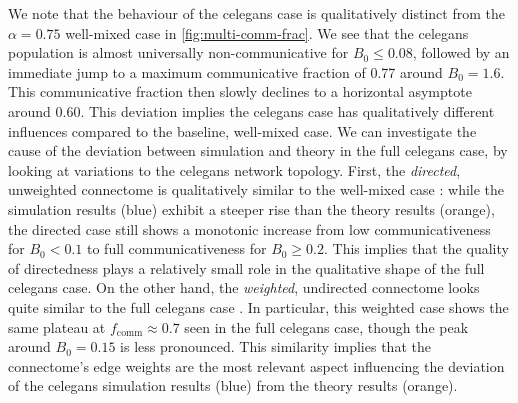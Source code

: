 \documentclass[pdflatex,lineno,referee,sn-nature]{sn-jnl}
\begin{document}
We note that the behaviour
of the  \gls{celegans} case
is qualitatively distinct
from the $\alpha = 0.75$ well-mixed case in \cref{fig:multi-comm-frac}.
We see that the \gls{celegans} population is almost universally non-communicative
for $B_0 \le 0.08$,
followed by an immediate jump to a maximum communicative fraction
of \num{0.77} around $B_0 = 1.6$.
This communicative fraction then slowly declines
to a horizontal asymptote around \num{0.60}.
This deviation implies the \gls{celegans} case
has qualitatively different influences compared to the baseline, well-mixed case.
We can investigate the cause of the deviation
between simulation and theory
in the  full \gls{celegans} case,
by looking at variations to the \gls{celegans} network topology.
First, the 
\emph{directed}, unweighted connectome
is qualitatively similar to the
well-mixed case :
while the simulation results (blue) exhibit a steeper rise
than the theory results (orange),
the directed case still shows a monotonic increase
from low communicativeness for $B_0 < 0.1$
to full communicativeness for $B_0 \ge 0.2$.
This implies that the quality of directedness
plays a relatively small role in the qualitative shape
of the  full \gls{celegans} case.
On the other hand,
the 
\emph{weighted}, undirected connectome
looks quite similar to the 
full \gls{celegans} case .
In particular, this 
weighted case
shows the same plateau at $f_{\text{comm}} \approx 0.7$
seen in the  full \gls{celegans} case,
though the peak around $B_0 = 0.15$ is less pronounced.
This similarity implies that the connectome's edge weights
are the most relevant aspect influencing the deviation
of the  \gls{celegans}
simulation results (blue) from the theory results (orange).
\end{document}
